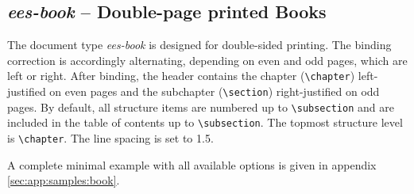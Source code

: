 \begin{description}
 \end{description}




\subsection{\textit{ees-book} -- Double-page printed Books}
\label{sec:documentTypes:book}
The document type \textit{ees-book} is designed for double-sided printing. The binding correction is accordingly alternating, depending on even and odd pages, which are left or right. After binding, the header contains the chapter (\lstinline|\chapter|) left-justified on even pages and the subchapter (\lstinline|\section|) right-justified on odd pages. By default, all structure items are numbered up to \lstinline|\subsection| and are included in the table of contents up to \lstinline|\subsection|. The topmost structure level is \lstinline|\chapter|. The line spacing is set to \num{1.5}.

A complete minimal example with all available options is given in appendix \ref{sec:app:samples:book}.




